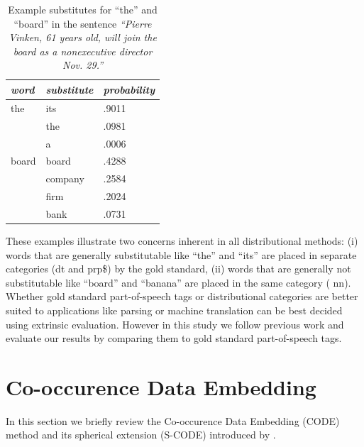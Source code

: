 \documentclass[11pt]{article}
\begin{document}
\begin{table}[h]\centering
\begin{tabular}{|l|ll|} \hline
\emph{word} & \emph{substitute} & \emph{probability} \\ \hline
the	& its & .9011 \\
	& the & .0981 \\
	& a & .0006 \\ \hline
board	& board & .4288 \\
	& company & .2584 \\
	& firm & .2024 \\
	& bank & .0731 \\ \hline
\end{tabular}
\caption{Example substitutes for ``the'' and ``board'' in the sentence {\em ``Pierre Vinken, 61 years old, will join the  board as a nonexecutive director Nov. 29.''}}
\label{tab:subs}
\end{table}

These examples illustrate two concerns inherent in all distributional
methods: (i) words that are generally substitutable like ``the'' and
``its'' are placed in separate categories ({\sc dt} and {\sc prp\$})
by the gold standard, (ii) words that are generally not substitutable
like ``board'' and ``banana'' are placed in the same category ({\sc
  nn}).  Whether gold standard part-of-speech tags or distributional
categories are better suited to applications like parsing or machine
translation can be best decided using extrinsic evaluation.  However
in this study we follow previous work and evaluate our results by
comparing them to gold standard part-of-speech tags.

\section{Co-occurence Data Embedding}

In this section we briefly review the Co-occurence Data Embedding
(CODE) method \cite{globerson2007euclidean} and its spherical
extension (S-CODE) introduced by \cite{maron2010sphere}.
\end{document}
